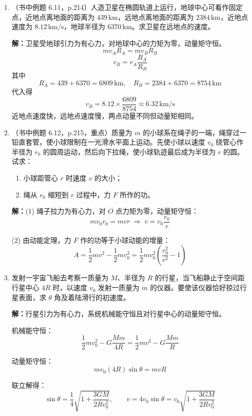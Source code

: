 \documentclass{ctexart}
\begin{document}
\begin{enumerate}
\textbf{解：}以滑轮轴为参考点，小孩和滑轮组成系统。
(1) 两小孩等重：系统所受外力矩（两小孩重力的力矩）大小相等、方向相反，合外力矩为零，系统角动量守恒。
起初 $v_1 = v_2 = 0$，$J = 0$；运动后仍 $J = 0$，即 $v_1 = v_2$，故同时到达滑轮。

(2) 两小孩不等重（$m_1 > m_2$）：合外力矩 $M = (m_2 - m_1)gR \neq 0$。
由角动量定理 $\dfrac{\mathrm{d}J}{\mathrm{d}t} = M$，体轻的小孩上升得快，先到达滑轮。

\item（书中例题 6.11，p.214）人造卫星在椭圆轨道上运行，地球中心可看作固定点，近地点离地面的距离为 $439\,\text{km}$，远地点离地面的距离为 $2384\,\text{km}$，近地点速度为 $8.12\,\text{km/s}$，地球半径为 $6370\,\text{km}$。求卫星在远地点的速度。

\textbf{解：}卫星受地球引力为有心力，对地球中心的力矩为零，动量矩守恒。
\[
mv_A R_A = mv_B R_B
\]
\[
v_B = v_A \frac{R_A}{R_B}
\]
其中
\[
R_A = 439 + 6370 = 6809\,\text{km},\quad
R_B = 2384 + 6370 = 8754\,\text{km}
\]
代入得
\[
v_B = 8.12 \times \frac{6809}{8754} \approx 6.32\,\text{km/s}
\]
近地点速度快，远地点速度慢，两点动量不同但动量矩相同。

\item（书中例题 6.12，p.215，重点）质量为 $m$ 的小球系在绳子的一端，绳穿过一铅直套管，使小球限制在一光滑水平面上运动。先使小球以速度 $v_0$ 绕管心作半径为 $r_0$ 的圆周运动，然后向下拉绳，使小球轨迹最后成为半径为 $r$ 的圆。试求：
\begin{enumerate}
  \item 小球距管心 $r$ 时速度 $v$ 的大小；
  \item 绳从 $r_0$ 缩短到 $r$ 过程中，力 $F$ 所作的功。
\end{enumerate}

\textbf{解：}(1) 绳子拉力为有心力，对 $O$ 点力矩为零，动量矩守恒：
\[
mv_0 r_0 = mvr \;\Longrightarrow\; v = v_0 \frac{r_0}{r}
\]

(2) 由动能定理，力 $F$ 作的功等于小球动能的增量：
\[
A = \frac12 mv^{2} - \frac12 mv_0^{2}
= \frac12 mv_0^{2}\left(\frac{r_0^{2}}{r^{2}} - 1\right)
\]

\item 发射一宇宙飞船去考察一质量为 $M$、半径为 $R$ 的行星，当飞船静止于空间距行星中心 $4R$ 时，以速度 $v_0$ 发射一质量为 $m$ 的仪器。要使该仪器恰好掠过行星表面，求 $\theta$ 角及着陆滑行的初速度。

\textbf{解：}行星引力为有心力，系统机械能守恒且对行星中心的动量矩守恒。

机械能守恒：
\[
\frac12 mv_0^{2} - G\frac{Mm}{4R} = \frac12 mv^{2} - G\frac{Mm}{R}
\]

动量矩守恒：
\[
mv_0(4R)\sin\theta = mvR
\]

联立解得：
\[
\sin\theta = \frac14\sqrt{1 + \frac{3GM}{2Rv_0^{2}}},\qquad
v = 4v_0\sin\theta = v_0\sqrt{1 + \frac{3GM}{2Rv_0^{2}}}
\]

\end{enumerate}
\end{document}
